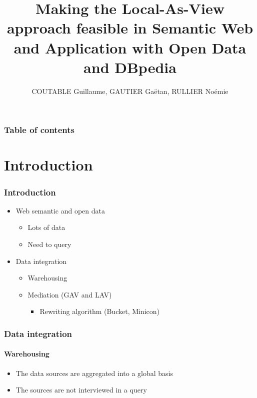 \documentclass{beamer}
\title{Making the Local-As-View approach feasible in Semantic Web and Application with Open Data and DBpedia}
\author{COUTABLE Guillaume, GAUTIER Gaëtan, RULLIER Noémie}
\begin{document}
\begin{frame}
\titlepage
\end{frame}

\begin{frame}
\frametitle{Table of contents}
\tableofcontents
\end{frame}

\section{Introduction}
\begin{frame}
\frametitle{Introduction}
\begin{center}
\begin{itemize}
\item Web semantic and open data
\begin{itemize}
\item Lots of data
\item Need to query
\end{itemize}
\item Data integration
\begin{itemize}
\item Warehousing
\item Mediation (GAV and LAV)
\begin{itemize}
\item Rewriting algorithm (Bucket, Minicon)
\end{itemize}
\end{itemize}
\end{itemize}
\end{center}
\end{frame}

\begin{frame}
\frametitle{Data integration}
\framesubtitle{Warehousing}
\begin{center}
\begin{itemize}
\item The data sources are aggregated into a global basis
\item The sources are not interviewed in a query
\end{itemize}
\end{center}
\end{frame}
\end{document}
